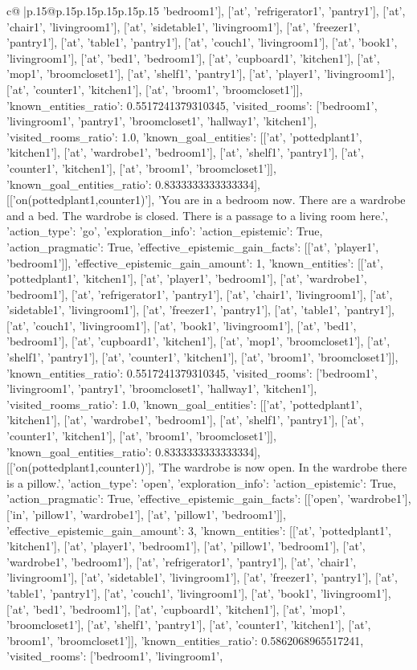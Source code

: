 \documentclass{article}
\begin{document}
{\begin{supertabular}{c@{$\;$}|p{.15\linewidth}@{}p{.15\linewidth}p{.15\linewidth}p{.15\linewidth}p{.15\linewidth}p{.15\linewidth}}
{{{'bedroom1'], ['at', 'refrigerator1', 'pantry1'], ['at', 'chair1', 'livingroom1'], ['at', 'sidetable1', 'livingroom1'], ['at', 'freezer1', 'pantry1'], ['at', 'table1', 'pantry1'], ['at', 'couch1', 'livingroom1'], ['at', 'book1', 'livingroom1'], ['at', 'bed1', 'bedroom1'], ['at', 'cupboard1', 'kitchen1'], ['at', 'mop1', 'broomcloset1'], ['at', 'shelf1', 'pantry1'], ['at', 'player1', 'livingroom1'], ['at', 'counter1', 'kitchen1'], ['at', 'broom1', 'broomcloset1']], 'known_entities_ratio': 0.5517241379310345, 'visited_rooms': ['bedroom1', 'livingroom1', 'pantry1', 'broomcloset1', 'hallway1', 'kitchen1'], 'visited_rooms_ratio': 1.0, 'known_goal_entities': [['at', 'pottedplant1', 'kitchen1'], ['at', 'wardrobe1', 'bedroom1'], ['at', 'shelf1', 'pantry1'], ['at', 'counter1', 'kitchen1'], ['at', 'broom1', 'broomcloset1']], 'known_goal_entities_ratio': 0.8333333333333334}}], [['on(pottedplant1,counter1)'], 'You are in a bedroom now. There are a wardrobe and a bed. The wardrobe is closed. There is a passage to a living room here.', {'action_type': 'go', 'exploration_info': {'action_epistemic': True, 'action_pragmatic': True, 'effective_epistemic_gain_facts': [['at', 'player1', 'bedroom1']], 'effective_epistemic_gain_amount': 1, 'known_entities': [['at', 'pottedplant1', 'kitchen1'], ['at', 'player1', 'bedroom1'], ['at', 'wardrobe1', 'bedroom1'], ['at', 'refrigerator1', 'pantry1'], ['at', 'chair1', 'livingroom1'], ['at', 'sidetable1', 'livingroom1'], ['at', 'freezer1', 'pantry1'], ['at', 'table1', 'pantry1'], ['at', 'couch1', 'livingroom1'], ['at', 'book1', 'livingroom1'], ['at', 'bed1', 'bedroom1'], ['at', 'cupboard1', 'kitchen1'], ['at', 'mop1', 'broomcloset1'], ['at', 'shelf1', 'pantry1'], ['at', 'counter1', 'kitchen1'], ['at', 'broom1', 'broomcloset1']], 'known_entities_ratio': 0.5517241379310345, 'visited_rooms': ['bedroom1', 'livingroom1', 'pantry1', 'broomcloset1', 'hallway1', 'kitchen1'], 'visited_rooms_ratio': 1.0, 'known_goal_entities': [['at', 'pottedplant1', 'kitchen1'], ['at', 'wardrobe1', 'bedroom1'], ['at', 'shelf1', 'pantry1'], ['at', 'counter1', 'kitchen1'], ['at', 'broom1', 'broomcloset1']], 'known_goal_entities_ratio': 0.8333333333333334}}], [['on(pottedplant1,counter1)'], 'The wardrobe is now open. In the wardrobe there is a pillow.', {'action_type': 'open', 'exploration_info': {'action_epistemic': True, 'action_pragmatic': True, 'effective_epistemic_gain_facts': [['open', 'wardrobe1'], ['in', 'pillow1', 'wardrobe1'], ['at', 'pillow1', 'bedroom1']], 'effective_epistemic_gain_amount': 3, 'known_entities': [['at', 'pottedplant1', 'kitchen1'], ['at', 'player1', 'bedroom1'], ['at', 'pillow1', 'bedroom1'], ['at', 'wardrobe1', 'bedroom1'], ['at', 'refrigerator1', 'pantry1'], ['at', 'chair1', 'livingroom1'], ['at', 'sidetable1', 'livingroom1'], ['at', 'freezer1', 'pantry1'], ['at', 'table1', 'pantry1'], ['at', 'couch1', 'livingroom1'], ['at', 'book1', 'livingroom1'], ['at', 'bed1', 'bedroom1'], ['at', 'cupboard1', 'kitchen1'], ['at', 'mop1', 'broomcloset1'], ['at', 'shelf1', 'pantry1'], ['at', 'counter1', 'kitchen1'], ['at', 'broom1', 'broomcloset1']], 'known_entities_ratio': 0.5862068965517241, 'visited_rooms': ['bedroom1', 'livingroom1', }}}
\end{supertabular}}
\end{document}
